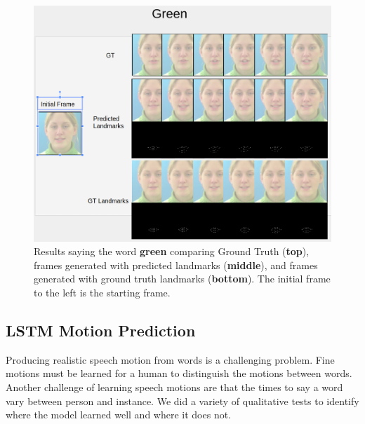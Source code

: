 \documentclass[10pt,twocolumn,letterpaper]{article}
\begin{document}
 \begin{figure}[t]
 	\begin{center}
 		\includegraphics [scale=0.33] {images/green.png}
 	\end{center}
 	\caption{Results saying the word \textbf{green} comparing Ground Truth (\textbf{top}), frames generated with predicted landmarks (\textbf{middle}), and frames generated with ground truth landmarks (\textbf{bottom}). The initial frame to the left is the starting frame.}
 	\label{fig:green}
 \end{figure}
 
\subsection{LSTM Motion Prediction}
 Producing realistic speech motion from words is a challenging problem. Fine motions must be learned for a human to distinguish the motions between words. Another challenge of learning speech motions are that the times to say a word vary between person and instance. We did a variety of qualitative tests to identify where the model learned well and where it does not. 
 
\end{document}
